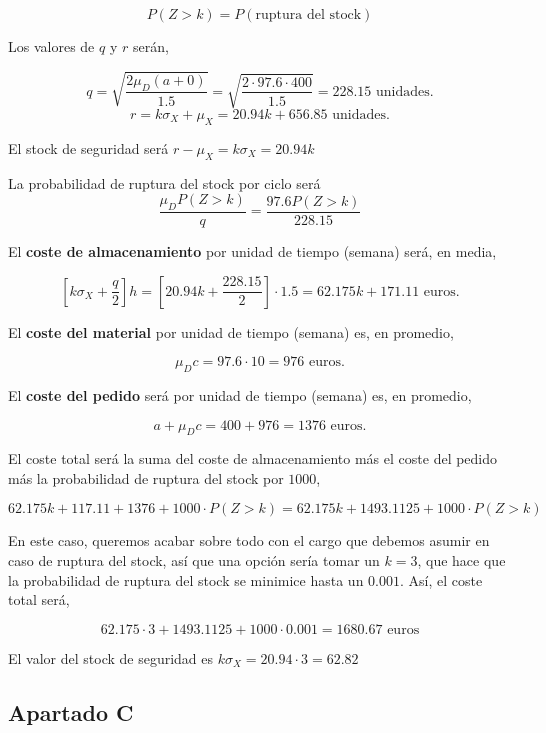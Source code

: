 \documentclass[a4paper,12pt]{article}
\begin{document}
$$ P(Z > k) = P(\text{ruptura del stock})$$

Los valores de $q$ y $r$ ser\'an,

$$ q = \sqrt{\dfrac{2\mu_D(a + 0)}{1.5}} = \sqrt{\dfrac{2\cdot 97.6\cdot 400}{1.5}} = 228.15 \text{ unidades.}$$
$$ r = k\sigma_X + \mu_X = 20.94k + 656.85 \text{ unidades.}$$

El stock de seguridad ser\'a $r - \mu_X = k\sigma_X = 20.94k$

La probabilidad de ruptura del stock por ciclo ser\'a $$ \dfrac{\mu_D P(Z > k)}{q} = \dfrac{97.6 P(Z > k)}{228.15}$$

El \textbf{coste de almacenamiento} por unidad de tiempo (semana) ser\'a, en media, 

$$ \left[k\sigma_X + \dfrac{q}{2}\right] h = \left[20.94k + \dfrac{228.15}{2} \right]\cdot 1.5 = 62.175k + 171.11 \text{ euros.}$$

El \textbf{coste del material} por unidad de tiempo (semana) es, en promedio,

$$ \mu_D c = 97.6\cdot 10 = 976 \text{ euros.}$$

El \textbf{coste del pedido} ser\'a por unidad de tiempo (semana) es, en promedio,

$$ a + \mu_D c = 400 + 976 = 1376 \text{ euros.}$$

El coste total ser\'a la suma del coste de almacenamiento m\'as el coste del pedido m\'as la probabilidad de ruptura del stock por $1000$,

$$ 62.175k + 117.11 + 1376 + 1000\cdot P(Z > k)= 62.175k + 1493.1125 + 1000\cdot P(Z > k)$$

En este caso, queremos acabar sobre todo con el cargo que debemos asumir en caso de ruptura del stock, as\'i que una opci\'on ser\'ia tomar un $k = 3$, que hace que la probabilidad de ruptura del stock se minimice hasta un $0.001$. As\'i, el coste total ser\'a,

$$ 62.175\cdot 3 + 1493.1125 + 1000\cdot 0.001 = 1680.67\text{ euros}$$

El valor del stock de seguridad es $k\sigma_X = 20.94 \cdot 3 = 62.82$
\pagebreak

\subsection{Apartado C}
\end{document}
